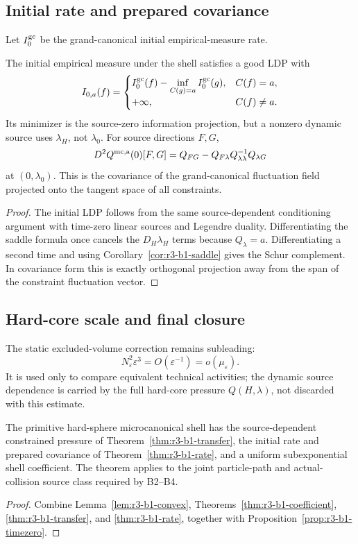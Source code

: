 \subsection{Initial rate and prepared covariance}

Let \(I_0^{\rm gc}\) be the grand-canonical initial empirical-measure rate.

\begin{theorem}
\label{thm:r3-b1-rate}
The initial empirical measure under the shell satisfies a good LDP with
\[
 I_{0,a}(f)
 =\begin{cases}
 I_0^{\rm gc}(f)-
 \displaystyle\inf_{C(g)=a}I_0^{\rm gc}(g),&C(f)=a,\\
 +\infty,&C(f)\ne a.
 \end{cases}
\]
Its minimizer is the source-zero information projection, but a nonzero dynamic
source uses \(\lambda_H\), not \(\lambda_0\).  For source directions \(F,G\),
\[
 D^2Q^{\rm mc,a}(0)[F,G]
 =Q_{FG}-Q_{F\lambda}
 Q_{\lambda\lambda}^{-1}Q_{\lambda G}
\]
at \((0,\lambda_0)\).  This is the covariance of the grand-canonical
fluctuation field projected onto the tangent space of all constraints.
\end{theorem}

\begin{proof}
The initial LDP follows from the same source-dependent conditioning argument
with time-zero linear sources and Legendre duality.  Differentiating the saddle
formula once cancels the \(D_H\lambda_H\) terms because
\(Q_\lambda=a\).  Differentiating a second time and using
Corollary~\ref{cor:r3-b1-saddle} gives the Schur complement.  In covariance
form this is exactly orthogonal projection away from the span of the
constraint fluctuation vector.
\end{proof}

\subsection{Hard-core scale and final closure}

The static excluded-volume correction remains subleading:
\[
 N_\varepsilon^2\varepsilon^3=O(\varepsilon^{-1})
 =o(\mu_\varepsilon).
\]
It is used only to compare equivalent technical activities; the dynamic
source dependence is carried by the full hard-core pressure \(Q(H,\lambda)\),
not discarded with this estimate.

\begin{theorem}
\label{thm:r3-b1-main}
The primitive hard-sphere microcanonical shell has the source-dependent
constrained pressure of Theorem~\ref{thm:r3-b1-transfer}, the initial rate and
prepared covariance of Theorem~\ref{thm:r3-b1-rate}, and a uniform
subexponential shell coefficient.  The theorem applies to the joint
particle-path and actual-collision source class required by B2--B4.
\end{theorem}

\begin{proof}
Combine Lemma~\ref{lem:r3-b1-convex},
Theorems~\ref{thm:r3-b1-coefficient}, \ref{thm:r3-b1-transfer}, and
\ref{thm:r3-b1-rate}, together with
Proposition~\ref{prop:r3-b1-timezero}.
\end{proof}
